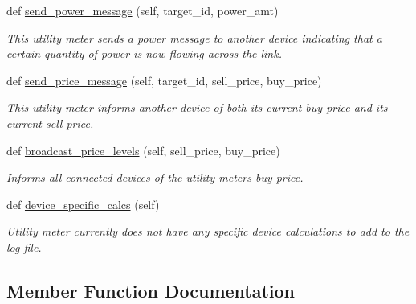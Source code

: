 \begin{DoxyCompactItemize}
def \hyperlink{class_build_1_1_objects_1_1utility__meter_1_1_utility_meter_adc1f007ca7702f7db08c7238e2cead00}{send\+\_\+power\+\_\+message} (self, target\+\_\+id, power\+\_\+amt)
\begin{DoxyCompactList}\small\item\em This utility meter sends a power message to another device indicating that a certain quantity of power is now flowing across the link. \end{DoxyCompactList}\item 
def \hyperlink{class_build_1_1_objects_1_1utility__meter_1_1_utility_meter_adc776ffbce82fa1dc11ed6ec012d768d}{send\+\_\+price\+\_\+message} (self, target\+\_\+id, sell\+\_\+price, buy\+\_\+price)
\begin{DoxyCompactList}\small\item\em This utility meter informs another device of both its current buy price and its current sell price. \end{DoxyCompactList}\item 
def \hyperlink{class_build_1_1_objects_1_1utility__meter_1_1_utility_meter_a6d5719f08ebc1a80f95a33f77de27a7c}{broadcast\+\_\+price\+\_\+levels} (self, sell\+\_\+price, buy\+\_\+price)
\begin{DoxyCompactList}\small\item\em Informs all connected devices of the utility meter\textquotesingle{}s buy price. \end{DoxyCompactList}\item 
\mbox{\label{class_build_1_1_objects_1_1utility__meter_1_1_utility_meter_af364127959babff26c2385e52c915f46}} 
def \hyperlink{class_build_1_1_objects_1_1utility__meter_1_1_utility_meter_af364127959babff26c2385e52c915f46}{device\+\_\+specific\+\_\+calcs} (self)
\begin{DoxyCompactList}\small\item\em Utility meter currently does not have any specific device calculations to add to the log file. \end{DoxyCompactList}\end{DoxyCompactItemize}


\subsection{Member Function Documentation}
\mbox{\label{class_build_1_1_objects_1_1utility__meter_1_1_utility_meter_a6d5719f08ebc1a80f95a33f77de27a7c}} 
